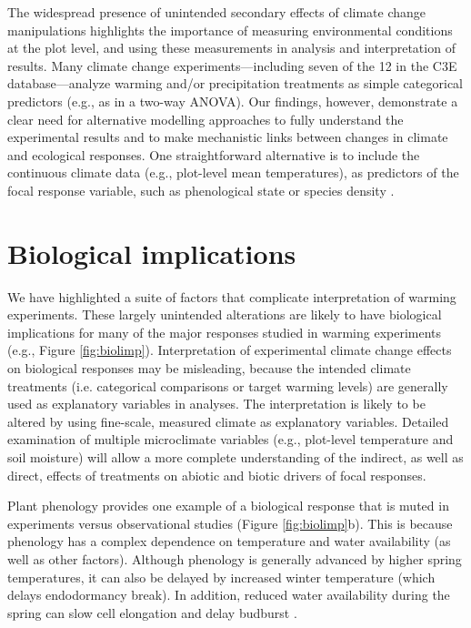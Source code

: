 \documentclass{article}
\begin{document}
\par The widespread presence of unintended secondary effects of climate change manipulations highlights the importance of measuring environmental conditions at the plot level, and using these measurements in analysis and interpretation of results. Many climate change experiments---including seven of the 12 in the C3E database---analyze warming and/or precipitation treatments as simple categorical predictors (e.g., as in a two-way ANOVA). Our findings, however, demonstrate a clear need for alternative modelling approaches to fully understand the experimental results and to make mechanistic links between changes in climate and ecological responses. One straightforward alternative is to include the continuous climate data (e.g., plot-level mean temperatures), as predictors of the focal response variable, such as phenological state or species density \citep [e.g.,][]{marchin2015, pelini2014}. 

\section* {Biological implications}

\par We have highlighted a suite of factors that complicate interpretation of warming experiments. These largely unintended alterations are likely to have biological implications for many of the major responses studied in warming experiments (e.g., Figure \ref{fig:biolimp}). Interpretation of experimental climate change effects on biological responses may be misleading, because the intended climate treatments (i.e. categorical comparisons or target warming levels) are generally used as explanatory variables in analyses. The interpretation is likely to be altered by using fine-scale, measured climate as explanatory variables. Detailed examination of multiple microclimate variables (e.g., plot-level temperature and soil moisture) will allow a more complete understanding of the indirect, as well as direct, effects of treatments on abiotic and biotic drivers of focal responses.

\par Plant phenology provides one example of a biological response that is muted in experiments versus observational studies (Figure \ref{fig:biolimp}b). This is because phenology has a complex dependence on temperature and water availability (as well as other factors). Although phenology is generally advanced by higher spring temperatures, it can also be delayed by increased winter temperature (which delays endodormancy break). In addition, reduced water availability during the spring can slow cell elongation and delay budburst \citep{penuelas2004,ourcival2011,craine2012,matthews2016}.
\end{document}
